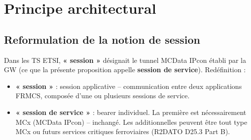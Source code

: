 \documentclass[11pt,a4paper]{article}
\begin{document}
\begin{titlepage}
\end{titlepage}

\tableofcontents\clearpage

\section{Principe architectural}

\subsection{Reformulation de la notion de session}

Dans les TS ETSI, \textbf{« session »} désignait le tunnel MCData IPcon établi par la
GW (ce que la présente proposition appelle \textbf{session de service}). Redéfinition :

\begin{itemize}[leftmargin=2em]
  \item \textbf{« session »} : session applicative -- communication entre deux
    applications FRMCS, composée d'une ou plusieurs sessions de service.
  \item \textbf{« session de service »} : bearer individuel. La première est
    nécessairement MCx (MCData IPcon) -- inchangé. Les additionnelles peuvent être
    tout type MCx ou futurs services critiques ferroviaires (R2DATO D25.3 Part B).
\end{itemize}
\end{document}
